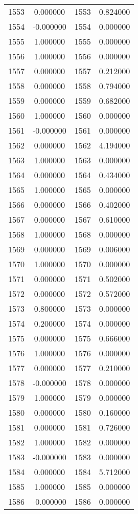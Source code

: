 \documentclass[12pt]{article}
\begin{document}
\begin{longtable}{@{}cccc@{}}
1553 & 0.000000 & 1553 & 0.824000 \\
1554 & -0.000000 & 1554 & 0.000000 \\
1555 & 1.000000 & 1555 & 0.000000 \\
1556 & 1.000000 & 1556 & 0.000000 \\
1557 & 0.000000 & 1557 & 0.212000 \\
1558 & 0.000000 & 1558 & 0.794000 \\
1559 & 0.000000 & 1559 & 0.682000 \\
1560 & 1.000000 & 1560 & 0.000000 \\
1561 & -0.000000 & 1561 & 0.000000 \\
1562 & 0.000000 & 1562 & 4.194000 \\
1563 & 1.000000 & 1563 & 0.000000 \\
1564 & 0.000000 & 1564 & 0.434000 \\
1565 & 1.000000 & 1565 & 0.000000 \\
1566 & 0.000000 & 1566 & 0.402000 \\
1567 & 0.000000 & 1567 & 0.610000 \\
1568 & 1.000000 & 1568 & 0.000000 \\
1569 & 0.000000 & 1569 & 0.006000 \\
1570 & 1.000000 & 1570 & 0.000000 \\
1571 & 0.000000 & 1571 & 0.502000 \\
1572 & 0.000000 & 1572 & 0.572000 \\
1573 & 0.800000 & 1573 & 0.000000 \\
1574 & 0.200000 & 1574 & 0.000000 \\
1575 & 0.000000 & 1575 & 0.666000 \\
1576 & 1.000000 & 1576 & 0.000000 \\
1577 & 0.000000 & 1577 & 0.210000 \\
1578 & -0.000000 & 1578 & 0.000000 \\
1579 & 1.000000 & 1579 & 0.000000 \\
1580 & 0.000000 & 1580 & 0.160000 \\
1581 & 0.000000 & 1581 & 0.726000 \\
1582 & 1.000000 & 1582 & 0.000000 \\
1583 & -0.000000 & 1583 & 0.000000 \\
1584 & 0.000000 & 1584 & 5.712000 \\
1585 & 1.000000 & 1585 & 0.000000 \\
1586 & -0.000000 & 1586 & 0.000000 \\

\end{longtable}
\end{document}
